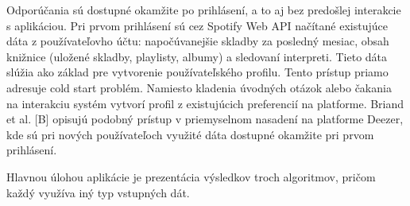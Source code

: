 

Odporúčania sú dostupné okamžite po prihlásení, a to aj bez predošlej interakcie s aplikáciou. Pri prvom prihlásení sú cez Spotify Web API načítané existujúce dáta z používateľovho účtu: napočúvanejšie skladby za posledný mesiac, obsah knižnice (uložené skladby, playlisty, albumy) a sledovaní interpreti. Tieto dáta slúžia ako základ pre vytvorenie používateľského profilu. Tento prístup priamo adresuje cold start problém. Namiesto kladenia úvodných otázok alebo čakania na interakciu systém vytvorí profil z existujúcich preferencií na platforme. Briand et al. [B] opisujú podobný prístup v priemyselnom nasadení na platforme Deezer, kde sú pri nových používateľoch využité dáta dostupné okamžite pri prvom prihlásení.



Hlavnou úlohou aplikácie je prezentácia výsledkov troch algoritmov, pričom každý využíva iný typ vstupných dát.

